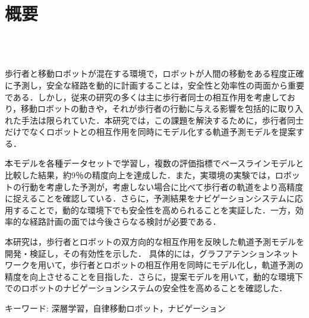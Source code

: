\chapter*{概要}
\thispagestyle{empty}
%
\begin{center}
  \scalebox{1.5}{移動ロボットのための深層学習を用いた}\\
  \scalebox{1.5}{歩行者の位置予測とナビゲーションへの応用}\\
\end{center}
\vspace{1.0zh}
%

歩行者と移動ロボットが混在する環境で，ロボットが人間の移動をある程度正確に予測し，安全な経路を動的に計画することは，安全性と効率性の両面から重要である．しかし，従来の研究の多くは主に歩行者同士の相互作用を考慮しており，移動ロボットの動きや，それが歩行者の行動に与える影響を包括的に取り入れた手法は限られていた．本研究では，この課題を解決するために，歩行者同士だけでなくロボットとの相互作用を同時にモデル化する軌道予測モデルを提案する．

本モデルを各種データセットで学習し，複数の評価指標でベースラインモデルと比較した結果，約9％の精度向上を達成した．また，実環境の実験では，ロボットの行動を考慮した予測が，考慮しない場合に比べて歩行者の軌道をより高精度に捉えることを確認している．さらに，予測結果をナビゲーションシステムに応用することで，動的な環境下でも安全性を高められることを実証した．一方，効率的な経路計画の面では今後さらなる検討が必要である．

本研究は，歩行者とロボットの双方向的な相互作用を反映した軌道予測モデルを開発・検証し，その有効性を示した．
具体的には，グラフアテンションネットワークを用いて，歩行者とロボットの相互作用を同時にモデル化し，軌道予測の精度を向上させることを目指した．さらに，提案モデルを用いて，動的な環境下でのロボットのナビゲーションシステムの安全性を高めることを確認した．

\begin{flushleft}
キーワード: 深層学習，自律移動ロボット，ナビゲーション
\end{flushleft}
%
\newpage
